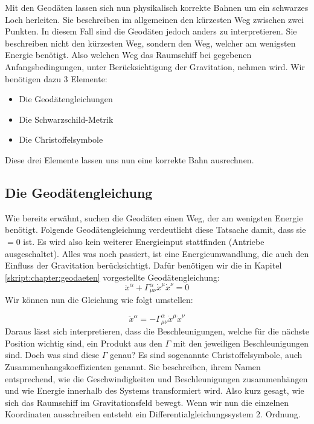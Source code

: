 \begin{refsection}
	Mit den Geodäten lassen sich nun physikalisch korrekte Bahnen um ein schwarzes Loch herleiten. Sie beschreiben im allgemeinen den kürzesten Weg zwischen zwei Punkten. In diesem Fall sind die Geodäten jedoch anders zu interpretieren. Sie beschreiben nicht den kürzesten Weg, sondern den Weg, welcher am wenigsten Energie benötigt. Also welchen Weg das Raumschiff bei gegebenen Anfangsbedingungen, unter Berücksichtigung der Gravitation, nehmen wird.  
	Wir benötigen dazu 3 Elemente:
	\begin{itemize}
		\item Die Geodätengleichungen
		\item Die Schwarzschild-Metrik
		\item Die Christoffelsymbole
	\end{itemize}
	Diese drei Elemente lassen uns nun eine korrekte Bahn ausrechnen.

	\subsection{Die Geodätengleichung}
	
	Wie bereits erwähnt, suchen die Geodäten einen Weg, der am wenigsten Energie benötigt.
	Folgende Geodätengleichung verdeutlicht diese Tatsache damit, dass sie $=0$ ist. Es wird also kein weiterer Energieinput stattfinden (Antriebe ausgeschaltet). Alles was noch passiert, ist eine Energieumwandlung, die auch den Einfluss der Gravitation berücksichtigt. 
	Dafür benötigen wir die in Kapitel \ref{skript:chapter:geodaeten}
	vorgestellte Geodätengleichung:	
	\begin{equation}
	\ddot{x}^{\alpha} + \Gamma^{\alpha}_{\mu\nu}\dot{x}^{\mu}\dot{x}^{\nu} = 0
	\end{equation}
	Wir k\"onnen nun die Gleichung wie folgt umstellen:	
	
	\begin{equation}
	\ddot{x}^{\alpha} = -\Gamma^{\alpha}_{\mu\nu}\dot{x}^{\mu}\dot{x}^{\nu}
	\end{equation}
	Daraus lässt sich interpretieren, dass die Beschleunigungen, welche für die nächste Position wichtig sind, ein Produkt aus den $\Gamma$ mit den jeweiligen Beschleunigungen sind.
	Doch was sind diese $\Gamma$ genau? Es sind sogenannte Christoffelsymbole, auch Zusammenhangskoeffizienten genannt. Sie beschreiben, ihrem Namen entsprechend, wie die Geschwindigkeiten und Beschleunigungen zusammenhängen und wie Energie innerhalb des Systems transformiert wird. Also kurz gesagt, wie sich das Raumschiff im Gravitationsfeld bewegt. Wenn wir nun die einzelnen Koordinaten ausschreiben entsteht ein Differentialgleichungssystem 2. Ordnung.
	

\end{refsection}
